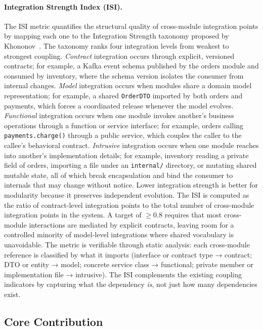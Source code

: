 \paragraph*{Integration Strength Index (ISI).} The ISI metric quantifies the structural quality of cross-module integration points by mapping each one to the Integration Strength taxonomy proposed by Khononov~\cite{khononov2024balancing}. The taxonomy ranks four integration levels from weakest to strongest coupling. \emph{Contract} integration occurs through explicit, versioned contracts; for example, a Kafka event schema published by the orders module and consumed by inventory, where the schema version isolates the consumer from internal changes. \emph{Model} integration occurs when modules share a domain model representation; for example, a shared \texttt{OrderDTO} imported by both orders and payments, which forces a coordinated release whenever the model evolves. \emph{Functional} integration occurs when one module invokes another's business operations through a function or service interface; for example, orders calling \texttt{payments.charge()} through a public service, which couples the caller to the callee's behavioral contract. \emph{Intrusive} integration occurs when one module reaches into another's implementation details; for example, inventory reading a private field of orders, importing a file under an \texttt{internal/} directory, or mutating shared mutable state, all of which break encapsulation and bind the consumer to internals that may change without notice. Lower integration strength is better for modularity because it preserves independent evolution. The ISI is computed as the ratio of contract-level integration points to the total number of cross-module integration points in the system. A target of $\geq 0.8$ requires that most cross-module interactions are mediated by explicit contracts, leaving room for a controlled minority of model-level integrations where shared vocabulary is unavoidable. The metric is verifiable through static analysis: each cross-module reference is classified by what it imports (interface or contract type → contract; DTO or entity → model; concrete service class → functional; private member or implementation file → intrusive). The ISI complements the existing coupling indicators by capturing what the dependency \emph{is}, not just how many dependencies exist.

\subsection*{Core Contribution}

